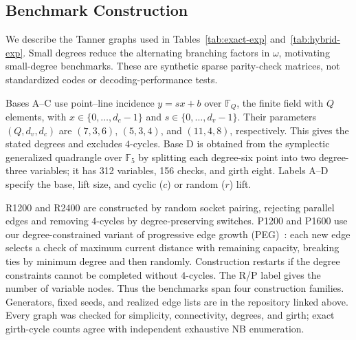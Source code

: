 \subsection{Benchmark Construction}
We describe the Tanner graphs used in
Tables~\ref{tab:exact-exp} and~\ref{tab:hybrid-exp}.
Small degrees reduce the alternating branching factors in $\omega$,
motivating small-degree benchmarks. These are synthetic sparse
parity-check matrices, not standardized codes or decoding-performance tests.

Bases A--C use point--line incidence $y=sx+b$ over $\mathbb F_Q$,
the finite field with $Q$ elements, with
$x\in\{0,\ldots,d_c-1\}$ and $s\in\{0,\ldots,d_v-1\}$.
Their parameters $(Q,d_v,d_c)$ are $(7,3,6)$, $(5,3,4)$, and
$(11,4,8)$, respectively. This gives the stated degrees and excludes
$4$-cycles. Base D is obtained from the symplectic generalized quadrangle
 over $\mathbb F_5$ by splitting each degree-six point into two
 degree-three variables; it has 312 variables, 156 checks, and girth eight.
Labels A--D specify the base, lift size, and cyclic ($c$) or random ($r$) lift.

R1200 and R2400 are constructed by random socket pairing, rejecting
parallel edges and removing $4$-cycles by degree-preserving switches.
P1200 and P1600 use our degree-constrained variant of progressive
edge growth (PEG)~\cite{hu2005}: each new edge selects a check of maximum
current distance with remaining capacity, breaking ties by minimum degree
and then randomly. Construction restarts if the degree constraints
cannot be completed without $4$-cycles. The R/P label gives the number
of variable nodes. Thus the benchmarks span four construction families.
Generators, fixed seeds, and realized edge lists are in the repository
linked above. Every graph was checked for simplicity, connectivity,
degrees, and girth; exact girth-cycle counts agree with independent
exhaustive NB enumeration.

